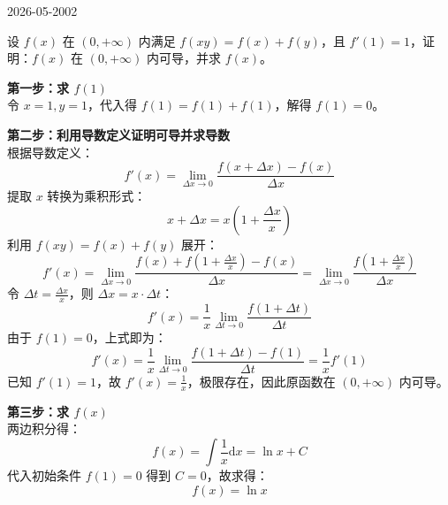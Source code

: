 \begin{mistake}{2026-05-20}{02}

\begin{problemcontent}
设 \(f(x)\) 在 \((0, +\infty)\) 内满足 \(f(xy) = f(x) + f(y)\)，且 \(f'(1) = 1\)，证明：\(f(x)\) 在 \((0, +\infty)\) 内可导，并求 \(f(x)\)。
\end{problemcontent}

\begin{solutioncontent}
\textbf{第一步：求 \(f(1)\)}\\
令 \(x = 1, y = 1\)，代入得 \(f(1) = f(1) + f(1)\)，解得 \(f(1) = 0\)。

\textbf{第二步：利用导数定义证明可导并求导数}\\
根据导数定义：
\[ f'(x) = \lim_{\Delta x \to 0} \frac{f(x + \Delta x) - f(x)}{\Delta x} \]
提取 \(x\) 转换为乘积形式：
\[ x + \Delta x = x\left(1 + \frac{\Delta x}{x}\right) \]
利用 \(f(xy)=f(x)+f(y)\) 展开：
\[ f'(x) = \lim_{\Delta x \to 0} \frac{f(x) + f\left(1 + \frac{\Delta x}{x}\right) - f(x)}{\Delta x} = \lim_{\Delta x \to 0} \frac{f\left(1 + \frac{\Delta x}{x}\right)}{\Delta x} \]
令 \(\Delta t = \frac{\Delta x}{x}\)，则 \(\Delta x = x \cdot \Delta t\)：
\[ f'(x) = \frac{1}{x} \lim_{\Delta t \to 0} \frac{f(1 + \Delta t)}{\Delta t} \]
由于 \(f(1) = 0\)，上式即为：
\[ f'(x) = \frac{1}{x} \lim_{\Delta t \to 0} \frac{f(1 + \Delta t) - f(1)}{\Delta t} = \frac{1}{x} f'(1) \]
已知 \(f'(1) = 1\)，故 \(f'(x) = \frac{1}{x}\)，极限存在，因此原函数在 \((0, +\infty)\) 内可导。

\textbf{第三步：求 \(f(x)\)}\\
两边积分得：
\[ f(x) = \int \frac{1}{x} \mathrm{d}x = \ln x + C \]
代入初始条件 \(f(1) = 0\) 得到 \(C = 0\)，故求得：
\[ f(x) = \ln x \]
\end{solutioncontent}


\end{mistake}
